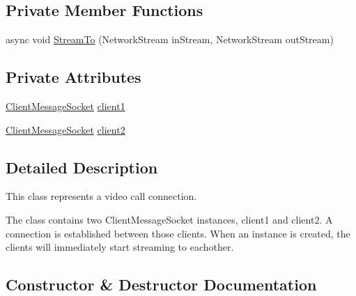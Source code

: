 \subsection*{Private Member Functions}
\begin{DoxyCompactItemize}
\item 
async void \hyperlink{class_e_l_i_server_1_1_call_connection_a01514395594e70da5e9acb48d908a238}{Stream\+To} (Network\+Stream in\+Stream, Network\+Stream out\+Stream)
\end{DoxyCompactItemize}
\subsection*{Private Attributes}
\begin{DoxyCompactItemize}
\item 
\hyperlink{class_e_l_i_server_1_1_messaging_1_1_client_message_socket}{Client\+Message\+Socket} \hyperlink{class_e_l_i_server_1_1_call_connection_adfdb5fc52756028eeac454f6e61e9de6}{client1}
\item 
\hyperlink{class_e_l_i_server_1_1_messaging_1_1_client_message_socket}{Client\+Message\+Socket} \hyperlink{class_e_l_i_server_1_1_call_connection_af687483721642ebfcb3eaf00e586c7a1}{client2}
\end{DoxyCompactItemize}


\subsection{Detailed Description}


This class represents a video call connection.

The class contains two Client\+Message\+Socket instances, client1 and client2. A connection is established between those clients. When an instance is created, the clients will immediately start streaming to eachother. 

\subsection{Constructor \& Destructor Documentation}
\mbox{\label{class_e_l_i_server_1_1_call_connection_ad0182673abc1aaffa6f4f539a727f782}} 
